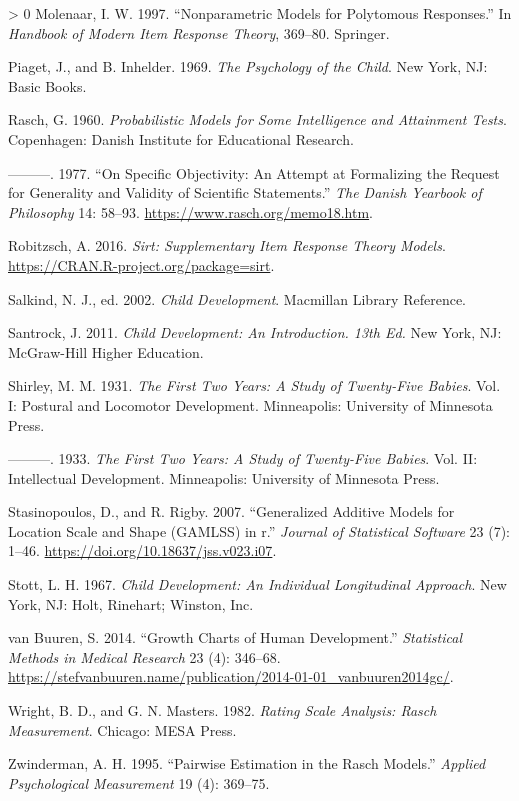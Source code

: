 \documentclass[
]{book}
\newlength{\cslhangindent}
\newenvironment{CSLReferences}[3] %
 {%
  \setlength{\parindent}{0pt}
  \ifodd #1 \everypar{\setlength{\hangindent}{\cslhangindent}}\ignorespaces\fi
  \ifnum #2 > 0
  \setlength{\parskip}{#2\baselineskip}
  \fi
 }%
 {}
\begin{document}
\begin{CSLReferences}{1}{0}
\leavevmode\hypertarget{ref-molenaar1997}{}%
Molenaar, I. W. 1997. {``Nonparametric Models for Polytomous Responses.''} In \emph{Handbook of Modern Item Response Theory}, 369--80. Springer.

\leavevmode\hypertarget{ref-piaget1969}{}%
Piaget, J., and B. Inhelder. 1969. \emph{The Psychology of the Child}. New York, NJ: Basic Books.

\leavevmode\hypertarget{ref-rasch1960}{}%
Rasch, G. 1960. \emph{Probabilistic Models for Some Intelligence and Attainment Tests}. Copenhagen: Danish Institute for Educational Research.

\leavevmode\hypertarget{ref-rasch1977}{}%
---------. 1977. {``On Specific Objectivity: An Attempt at Formalizing the Request for Generality and Validity of Scientific Statements.''} \emph{The Danish Yearbook of Philosophy} 14: 58--93. \url{https://www.rasch.org/memo18.htm}.

\leavevmode\hypertarget{ref-robitzsch2016}{}%
Robitzsch, A. 2016. \emph{Sirt: Supplementary Item Response Theory Models}. \url{https://CRAN.R-project.org/package=sirt}.

\leavevmode\hypertarget{ref-salkind2002}{}%
Salkind, N. J., ed. 2002. \emph{Child Development}. Macmillan Library Reference.

\leavevmode\hypertarget{ref-santrock2010}{}%
Santrock, J. 2011. \emph{Child Development: An Introduction. 13th Ed.} New York, NJ: McGraw-Hill Higher Education.

\leavevmode\hypertarget{ref-shirley1931}{}%
Shirley, M. M. 1931. \emph{The First Two Years: A Study of Twenty-Five Babies}. Vol. I: Postural and Locomotor Development. Minneapolis: University of Minnesota Press.

\leavevmode\hypertarget{ref-shirley1933}{}%
---------. 1933. \emph{The First Two Years: A Study of Twenty-Five Babies}. Vol. II: Intellectual Development. Minneapolis: University of Minnesota Press.

\leavevmode\hypertarget{ref-stasinopoulos2007}{}%
Stasinopoulos, D., and R. Rigby. 2007. {``Generalized Additive Models for Location Scale and Shape ({GAMLSS}) in r.''} \emph{Journal of Statistical Software} 23 (7): 1--46. \url{https://doi.org/10.18637/jss.v023.i07}.

\leavevmode\hypertarget{ref-stott1967}{}%
Stott, L. H. 1967. \emph{Child Development: {A}n Individual Longitudinal Approach}. New York, NJ: Holt, Rinehart; Winston, Inc.

\leavevmode\hypertarget{ref-vanbuuren2014}{}%
van Buuren, S. 2014. {``Growth Charts of Human Development.''} \emph{Statistical Methods in Medical Research} 23 (4): 346--68. \url{https://stefvanbuuren.name/publication/2014-01-01_vanbuuren2014gc/}.

\leavevmode\hypertarget{ref-wright1982}{}%
Wright, B. D., and G. N. Masters. 1982. \emph{Rating Scale Analysis: Rasch Measurement}. Chicago: MESA Press.

\leavevmode\hypertarget{ref-zwinderman1995}{}%
Zwinderman, A. H. 1995. {``Pairwise Estimation in the Rasch Models.''} \emph{Applied Psychological Measurement} 19 (4): 369--75.

\end{CSLReferences}
\end{document}
